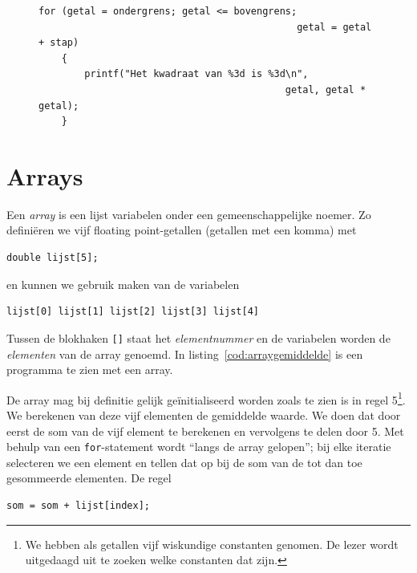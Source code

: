 \begin{figure}[!ht]
\begin{lstlisting}[caption=Gebruik van een \texttt{for}-statement.,label=cod:unfor]
	for (getal = ondergrens; getal <= bovengrens;
                                             getal = getal + stap)
	{
		printf("Het kwadraat van %3d is %3d\n",
                                           getal, getal * getal);
	}
\end{lstlisting}
\end{figure}


\section{Arrays}
Een \textsl{array} is een lijst variabelen onder een gemeenschappelijke noemer. Zo definiëren we vijf floating point-getallen (getallen met een komma) met

\begin{lstlisting}[style=lstoneline]
double lijst[5];
\end{lstlisting}

en kunnen we gebruik maken van de variabelen

\begin{lstlisting}[style=lstoneline]
lijst[0] lijst[1] lijst[2] lijst[3] lijst[4]
\end{lstlisting}

Tussen de blokhaken \texttt{[]}\indexop{[]} staat het \textsl{elementnummer} en de variabelen worden de \textsl{elementen} van de array genoemd. In listing~\ref{cod:arraygemiddelde} is een programma te zien met een array.


De array mag bij definitie gelijk geïnitialiseerd worden zoals te zien is in regel 5\footnote{We hebben als getallen vijf wiskundige constanten genomen. De lezer wordt uitgedaagd uit te zoeken welke constanten dat zijn.}. We berekenen van deze vijf elementen de gemiddelde waarde. We doen dat door eerst de som van de vijf element te berekenen en vervolgens te delen door 5. Met behulp van een \texttt{for}-statement wordt ``langs de array gelopen''; bij elke iteratie selecteren we een element en tellen dat op bij de som van de tot dan toe gesommeerde elementen. De regel

\begin{lstlisting}[style=lstoneline]
som = som + lijst[index];
\end{lstlisting}

